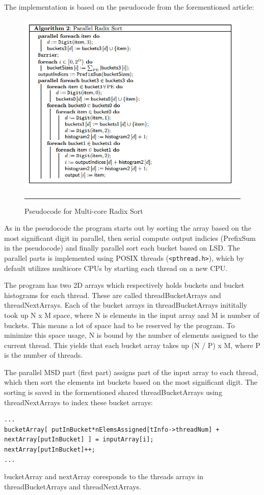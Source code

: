 The implementation is based on the pseudocode from the forementioned article:
\begin{figure}[htbp]
	\centering
		\includegraphics[width=\textwidth]{./Figures/Project2b/MultiCoreRadix_Pseudo.jpg}
		\rule{35em}{0.5pt}
	\caption[Multicore radix pseudocode]{
	Pseudocode for Multi-core Radix Sort
	}
	\label{fig:Branch_misses}
\end{figure}
As in the pseudocode the program starts out by sorting the array based on the most significant digit in parallel, then serial compute output indicies (PrefixSum in the pseudocode) and finally parallel sort each bucket based on LSD.  
The parallel parts is implemented using POSIX threads (\verb!<pthread.h>!), which by default utilizes multicore CPUs by starting each thread on a new CPU.

The program has two 2D arrays which respectively holds buckets and bucket histograms for each thread. These are called threadBucketArrays and threadNextArrays.
Each of the bucket arrays in threadBucketArrays inititally took up N x M space, where N is elements in the input array and M is number of buckets.
This means a lot of space had to be reserved by the program. To minimize this space usage, N is bound by the number of elements assigned to the current thread.
This yields that each bucket array takes up (N / P) x M, where P is the number of threads. 

The parallel MSD part (first part) assigns part of the input array to each thread, which then sort the elements int buckets based on the most significant digit.
The sorting is saved in the formentioned shared threadBucketArrays using threadNextArrays to index these bucket arrays:
\begin{lstlisting}
...
bucketArray[ putInBucket*nElemsAssigned[tInfo->threadNum] + nextArray[putInBucket] ] = inputArray[i];
nextArray[putInBucket]++; 
... 
\end{lstlisting}
bucketArray and nextArray coresponds to the threads arrays in threadBucketArrays and threadNextArrays.

